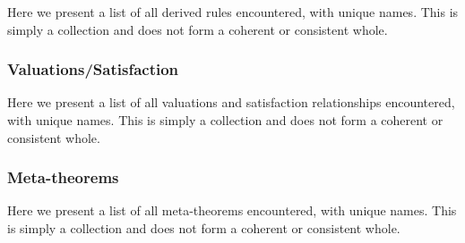 Here we present a list of all derived rules encountered,
with unique names.
This is simply a collection and does not form a coherent
or consistent whole.


\subsubsection{Valuations/Satisfaction}

Here we present a list of all valuations
and satisfaction relationships encountered,
with unique names.
This is simply a collection and does not form a coherent
or consistent whole.


\subsubsection{Meta-theorems}

Here we present a list of all meta-theorems encountered,
with unique names.
This is simply a collection and does not form a coherent
or consistent whole.
